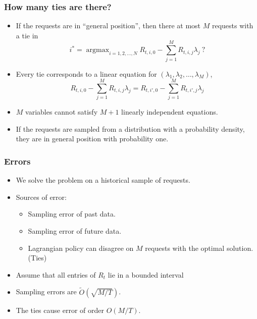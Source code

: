 \documentclass[usenames,dvipsnames]{beamer}
\DeclareMathOperator*{\argmax}{argmax}
\begin{document}
\begin{frame}
\frametitle{How many ties are there?}

\begin{itemize}
\item If the requests are in ``general position'', then there at most $M$ requests with a tie in
$$
i^* = \argmax_{i=1,2,\dots,N} R_{t,i,0} - \sum_{j=1}^M R_{t,i,j} \lambda_j \ ?
$$

\item Every tie corresponds to a linear equation for $(\lambda_1, \lambda_2, \dots, \lambda_M)$,
$$
R_{t,i,0} - \sum_{j=1}^M R_{t,i,j} \lambda_j = R_{t,i',0} - \sum_{j=1}^M R_{t,i',j} \lambda_j
$$

\item $M$ variables cannot satisfy $M+1$ linearly independent equations.

\item If the requests are sampled from a distribution with a probability density,
they are in general position with probability one.
\end{itemize}

\end{frame}

\begin{frame}
\frametitle{Errors}

\begin{itemize}
\item We solve the problem on a historical sample of requests.
\item Sources of error:
\begin{itemize}
\item Sampling error of past data.
\item Sampling error of future data.
\item Lagrangian policy can disagree on $M$ requests with the optimal solution. (Ties)
\end{itemize}

\item Assume that all entries of $R_t$ lie in a bounded interval
\item Sampling errors are $\widetilde{O}(\sqrt{M/T})$.
\item The ties cause error of order $O(M/T)$.
\end{itemize}

\end{frame}
\end{document}
